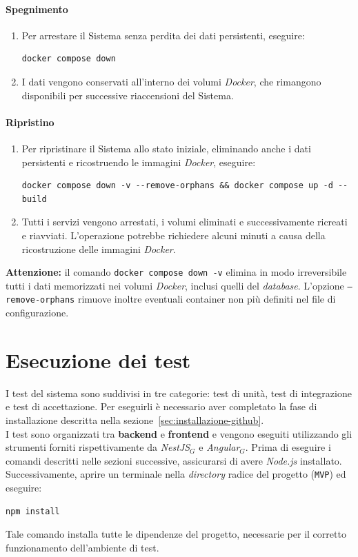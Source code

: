 \documentclass[10pt, letterpaper]{article}
\begin{document}
\paragraph{Spegnimento}

\begin{enumerate}
    \item Per arrestare il Sistema senza perdita dei dati persistenti, eseguire:
\begin{verbatim}
docker compose down
\end{verbatim}

    \item I dati vengono conservati all'interno dei volumi \textit{Docker}, che rimangono disponibili per successive riaccensioni del Sistema.
\end{enumerate}

\paragraph{Ripristino}

\begin{enumerate}
    \item Per ripristinare il Sistema allo stato iniziale, eliminando anche i dati persistenti e ricostruendo le immagini \textit{Docker}, eseguire:
\begin{verbatim}
docker compose down -v --remove-orphans && docker compose up -d --build
\end{verbatim}

    \item Tutti i servizi vengono arrestati, i volumi eliminati e successivamente ricreati e riavviati. L'operazione potrebbe richiedere alcuni minuti a causa della ricostruzione delle immagini \textit{Docker}.
\end{enumerate}
\textbf{Attenzione:} il comando \texttt{docker compose down -v} elimina in modo irreversibile tutti i dati memorizzati nei volumi \textit{Docker}, inclusi quelli del \textit{database}. 
L'opzione \texttt{--remove-orphans} rimuove inoltre eventuali container non più definiti nel file di configurazione.

\section{Esecuzione dei test}

I test del sistema sono suddivisi in tre categorie: test di unità, test di integrazione e test di accettazione.
Per eseguirli è necessario aver completato la fase di installazione descritta nella sezione~\ref{sec:installazione-github}.
\\I test sono organizzati tra \textbf{backend} e \textbf{frontend} e vengono eseguiti utilizzando gli strumenti forniti rispettivamente da \textit{NestJS}$_G$ e \textit{Angular}$_G$.
Prima di eseguire i comandi descritti nelle sezioni successive, assicurarsi di avere \textit{Node.js} installato. Successivamente, aprire un terminale nella \textit{directory} radice del progetto (\texttt{MVP}) ed eseguire:
\begin{verbatim}
npm install
\end{verbatim}
Tale comando installa tutte le dipendenze del progetto, necessarie per il corretto funzionamento dell'ambiente di test.
\end{document}
